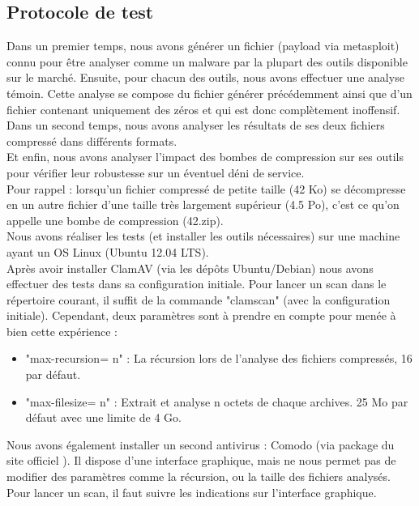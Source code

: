 \documentclass[smallextended]{svjour3}       %
\begin{document}
\subsection{Protocole de test}
\label{3.1Protocole}
Dans un premier temps, nous avons générer un fichier (payload via metasploit) connu pour être analyser comme un malware par la plupart des outils disponible sur le marché. Ensuite, pour chacun des outils, nous avons effectuer une analyse témoin. Cette analyse se compose du fichier générer précédemment ainsi que d'un fichier contenant uniquement des zéros et qui est donc complètement inoffensif.\\
Dans un second temps, nous avons analyser les résultats de ses deux fichiers compressé dans différents formats.\\
Et enfin, nous avons analyser l'impact des bombes de compression sur ses outils pour vérifier leur robustesse sur un éventuel déni de service.\\
Pour rappel : lorsqu'un fichier compressé de petite taille (42 Ko) se décompresse en un autre fichier d'une taille très largement supérieur (4.5 Po), c'est ce qu'on appelle une bombe de compression (42.zip).\\
$ $\\
Nous avons réaliser les tests (et installer les outils nécessaires) sur une machine ayant un OS Linux (Ubuntu 12.04 LTS).\\
Après avoir installer ClamAV (via les dépôts Ubuntu/Debian) nous avons effectuer des tests dans sa configuration initiale. Pour lancer un scan dans le répertoire courant, il suffit de la commande "clamscan" (avec la configuration initiale). Cependant, deux paramètres sont à prendre en compte pour menée à bien cette expérience :
\begin{itemize}
\item "max-recursion= n" : La récursion lors de l'analyse des fichiers compressés, 16 par défaut.
\item "max-filesize= n" : Extrait et analyse  n octets de chaque archives. 25 Mo par défaut avec une limite de 4 Go.
\end{itemize}
$ $\\
Nous avons également installer un second antivirus : Comodo (via package du site officiel \cite{Comodo}). Il dispose d'une interface graphique, mais ne nous permet pas de modifier des paramètres comme la récursion, ou la taille des fichiers analysés. Pour lancer un scan, il faut suivre les indications sur l'interface graphique.\\
\end{document}
